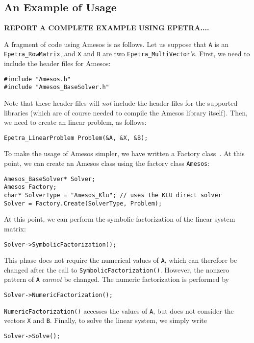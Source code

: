 \documentclass[acmtocl]{acmtrans2m}
\begin{document}
\subsection{An Example of Usage}
\label{sec:basic}

{\bf REPORT A COMPLETE EXAMPLE USING EPETRA....}

A fragment of code using Amesos is as follows.
Let us suppose that \verb!A! is an \verb!Epetra_RowMatrix!, and \verb!X! and
\verb!B! are two \verb!Epetra_MultiVector!'s. 
First,
  we need to include the header files for Amesos:
\begin{verbatim}
#include "Amesos.h"
#include "Amesos_BaseSolver.h"
\end{verbatim}
Note that these header files will {\sl not} include the header files for the
supported libraries (which are of course needed to compile the Amesos
library itself).  Then, we need to create an linear problem, as follows:
\begin{verbatim}
Epetra_LinearProblem Problem(&A, &X, &B);
\end{verbatim}
To make the usage of Amesos simpler, we have written a Factory
class~\cite{xxx}.
At this point, we can create an Amesos class using the factory class
\verb!Amesos!:
\begin{verbatim}
Amesos_BaseSolver* Solver;
Amesos Factory;
char* SolverType = "Amesos_Klu"; // uses the KLU direct solver
Solver = Factory.Create(SolverType, Problem);
\end{verbatim}
At this point, we can perform the symbolic factorization
of the linear system matrix:
\begin{verbatim}
Solver->SymbolicFactorization();
\end{verbatim}
This phase does not require the numerical values of \verb!A!, which can
therefore be changed after the call to \verb!SymbolicFactorization()!.
However,  the nonzero pattern of \verb!A! {\em cannot} be
changed.
The numeric factorization is performed by
\begin{verbatim}
Solver->NumericFactorization();
\end{verbatim}
\verb!NumericFactorization()! accesses the values of \verb!A!, but does not
consider the vectors \verb!X! and \verb!B!. Finally, to solve the linear
system, we simply write
\begin{verbatim}
Solver->Solve();
\end{verbatim}
\end{document}
